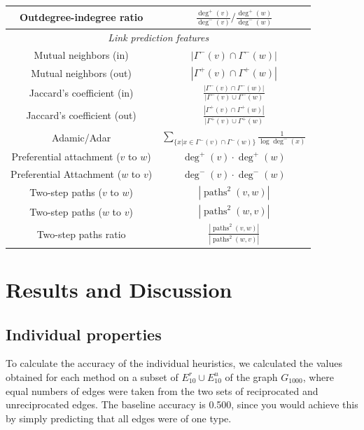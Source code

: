 \documentclass[conference]{IEEEtran}
\begin{document}
\begin{table}[!t]
\begin{tabular}{|c||c|}
\hline
Outdegree-indegree ratio & $\frac{\deg^+(v)}{\deg^-(v)} / \frac{\deg^+(w)}{\deg^-(w)} $ \\
\hline
\multicolumn{2}{|c|}{\emph{Link prediction features}} \\
\hline
Mutual neighbors (in) & $|\Gamma^-(v) \cap \Gamma^-(w)|$ \\
Mutual neighbors (out) & $|\Gamma^+(v) \cap \Gamma^+(w)|$ \\
\hline
Jaccard's coefficient (in) & $\frac{|\Gamma^-(v) \cap \Gamma^-(w)|}{|\Gamma^-(v) \cup \Gamma^-(w)}$ \\
Jaccard's coefficient (out) & $\frac{|\Gamma^+(v) \cap \Gamma^+(w)|}{|\Gamma^+(v) \cup \Gamma^+(w)}$ \\
\hline
Adamic/Adar & $\sum_{\{x|x \in \Gamma^-(v) \cap \Gamma^-(w)\}} \frac{1}{\log{\deg^-(x)}}$ \\
\hline
Preferential attachment ($v$ to $w$) & $\deg^+(v)\cdot \deg^+(w)$ \\
Preferential Attachment ($w$ to $v$) & $\deg^-(v)\cdot \deg^-(w)$ \\
\hline
Two-step paths ($v$ to $w$) & $ |\operatorname{paths}^2(v,w)|$ \\
Two-step paths ($w$ to $v$) & $ |\operatorname{paths}^2(w,v)|$ \\
\hline
Two-step paths ratio & $\frac{|\operatorname{paths}^2(v,w)|}{|\operatorname{paths}^2(w,v)|}$ \\
\hline
\end{tabular}
\end{table}

\section{Results and Discussion}

\subsection{Individual properties}
To calculate the accuracy of the individual heuristics, we calculated the values obtained for each method on a subset of $E_{10}^r \cup E_{10}^u$ of the graph $G_{1000}$, where equal numbers of edges were taken from the two sets of reciprocated and unreciprocated edges. The baseline accuracy is 0.500, since you would achieve this by simply predicting that all edges were of one type.
\end{document}
